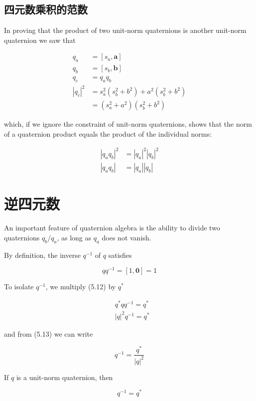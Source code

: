 \subsection{四元数乘积的范数}
In proving that the product of two unit-norm quaternions is another unit-norm quaternion we saw that

$$
\begin{aligned}
q_{a} & =\left[s_{a}, \mathbf{a}\right] \\
q_{b} & =\left[s_{b}, \mathbf{b}\right] \\
q_{c} & =q_{a} q_{b} \\
\left|q_{c}\right|^{2} & =s_{a}^{2}\left(s_{b}^{2}+b^{2}\right)+a^{2}\left(s_{b}^{2}+b^{2}\right) \\
& =\left(s_{a}^{2}+a^{2}\right)\left(s_{b}^{2}+b^{2}\right)
\end{aligned}
$$

which, if we ignore the constraint of unit-norm quaternions, shows that the norm of a quaternion product equals the product of the individual norms:

$$
\begin{aligned}
\left|q_{a} q_{b}\right|^{2} & =\left|q_{a}\right|^{2}\left|q_{b}\right|^{2} \\
\left|q_{a} q_{b}\right| & =\left|q_{a}\right|\left|q_{b}\right|
\end{aligned}
$$

\section{逆四元数}
An important feature of quaternion algebra is the ability to divide two quaternions $q_{b} / q_{a}$, as long as $q_{a}$ does not vanish.

By definition, the inverse $q^{-1}$ of $q$ satisfies

$$
q q^{-1}=[1, \mathbf{0}]=1
$$

To isolate $q^{-1}$, we multiply (5.12) by $q^{*}$

$$
\begin{aligned}
& q^{*} q q^{-1}=q^{*} \\
& |q|^{2} q^{-1}=q^{*}
\end{aligned}
$$

and from (5.13) we can write

$$
q^{-1}=\frac{q^{*}}{|q|^{2}}
$$

If $q$ is a unit-norm quaternion, then

$$
q^{-1}=q^{*}
$$

